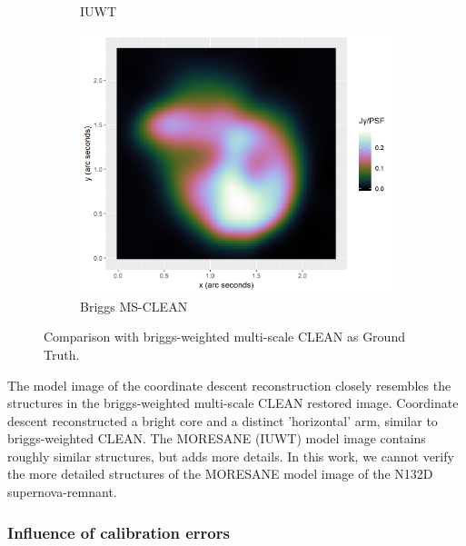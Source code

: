 \begin{figure}[h]
\begin{subfigure}{0.3\linewidth}
		\caption{IUWT}
	\end{subfigure}
	\begin{subfigure}{0.3\linewidth}
		\includegraphics[width=1.00\linewidth]{./chapters/10.results/MSClean/Briggs-N132.png}
		\caption{Briggs MS-CLEAN}
	\end{subfigure}
	\caption{Comparison with briggs-weighted multi-scale CLEAN as Ground Truth.}
	\label{results:cleancomp:N132:truth}
\end{figure}

The model image of the coordinate descent reconstruction closely resembles the structures in the briggs-weighted multi-scale CLEAN restored image. Coordinate descent reconstructed a bright core and a distinct 'horizontal' arm, similar to briggs-weighted CLEAN. The MORESANE (IUWT) model image contains roughly similar structures, but adds more details. In this work, we cannot verify the more detailed structures of the MORESANE model image of the N132D supernova-remnant.

\subsubsection{Influence of calibration errors}


